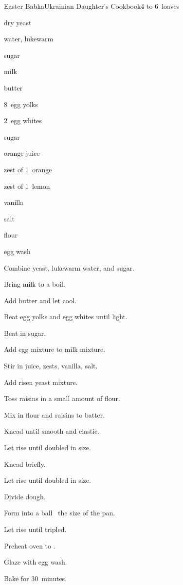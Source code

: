 \begin{recipe}{Easter Babka}{Ukrainian Daughter's Cookbook}{4 to 6~loaves}

\begin{ingredients}
\item {} dry yeast
\item \C{\third} water, lukewarm
\item {} sugar
\item {} milk
\item \C{\half} butter
\item 8~egg yolks
\item 2~egg whites
\item {} sugar
\item \C{\half} orange juice
\item zest of 1~orange
\item zest of 1~lemon
\item {} vanilla
\item {} salt
\item {} flour
\item \C{\half} 
\item egg wash
\end{ingredients}

\begin{directions}
\item Combine yeast, lukewarm water, and  sugar.
\item Bring milk to a boil.
\item Add butter and let cool.
\item Beat egg yolks and egg whites until light.
\item Beat in sugar.
\item Add egg mixture to milk mixture.
\item Stir in juice, zests, vanilla, salt.
\item Add risen yeast mixture.
\item Toss raisins in a small amount of flour.
\item Mix in flour and raisins to batter.
\item Knead until smooth and elastic.
\item Let rise until doubled in size.
\item Knead briefly.
\item Let rise until doubled in size.
\item Divide dough.
\item Form into a ball \third~the size of the pan.
\item Let rise until tripled.
\item Preheat oven to .
\item Glaze with egg wash.
\item Bake for 30~minutes.
\end{directions}

\end{recipe}
